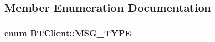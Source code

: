 \subsection{Member Enumeration Documentation}
\hypertarget{classBTClient_aa4e607f3ba1fea67548e2c2864915cb8}{
\subsubsection[{M\-S\-G\-\_\-\-T\-Y\-P\-E}]{\setlength{\rightskip}{0pt plus 5cm}enum {\bf B\-T\-Client\-::\-M\-S\-G\-\_\-\-T\-Y\-P\-E}\hspace{0.3cm}{\ttfamily [private]}}}\label{classBTClient_aa4e607f3ba1fea67548e2c2864915cb8}
